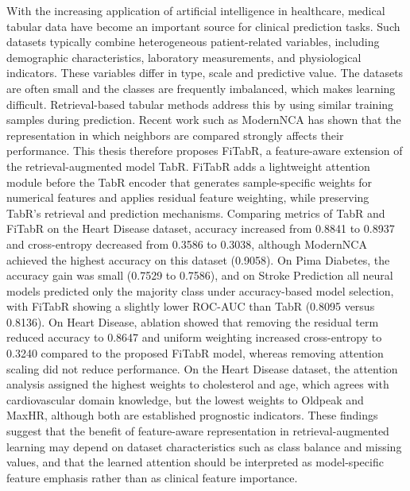 {}
\begin{EnglishSummary}
With the increasing application of artificial intelligence in healthcare, medical tabular data have become an important source for clinical prediction tasks. Such datasets typically combine heterogeneous patient-related variables, including demographic characteristics, laboratory measurements, and physiological indicators. These variables differ in type, scale and predictive value. The datasets are often small and the classes are frequently imbalanced, which makes learning difficult. Retrieval-based tabular methods address this by using similar training samples during prediction. Recent work such as ModernNCA has shown that the representation in which neighbors are compared strongly affects their performance. This thesis therefore proposes FiTabR, a feature-aware extension of the retrieval-augmented model TabR. FiTabR adds a lightweight attention module before the TabR encoder that generates sample-specific weights for numerical features and applies residual feature weighting, while preserving TabR's retrieval and prediction mechanisms. Comparing metrics of TabR and FiTabR on the Heart Disease dataset, accuracy increased from 0.8841 to 0.8937 and cross-entropy decreased from 0.3586 to 0.3038, although ModernNCA achieved the highest accuracy on this dataset (0.9058). On Pima Diabetes, the accuracy gain was small (0.7529 to 0.7586), and on Stroke Prediction all neural models predicted only the majority class under accuracy-based model selection, with FiTabR showing a slightly lower ROC-AUC than TabR (0.8095 versus 0.8136). On Heart Disease, ablation showed that removing the residual term reduced accuracy to 0.8647 and uniform weighting increased cross-entropy to 0.3240 compared to the proposed FiTabR model, whereas removing attention scaling did not reduce performance. On the Heart Disease dataset, the attention analysis assigned the highest weights to cholesterol and age, which agrees with cardiovascular domain knowledge, but the lowest weights to Oldpeak and MaxHR, although both are established prognostic indicators. These findings suggest that the benefit of feature-aware representation in retrieval-augmented learning may depend on dataset characteristics such as class balance and missing values, and that the learned attention should be interpreted as model-specific feature emphasis rather than as clinical feature importance.
\end{EnglishSummary}